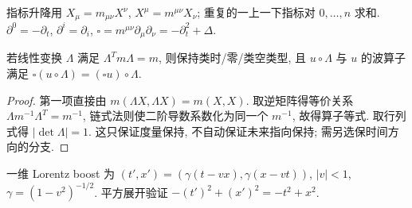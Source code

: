 指标升降用 $X_\mu=m_{\mu\nu}X^\nu$, $X^\mu=m^{\mu\nu}X_\nu$; 重复的一上一下指标对 $0,\ldots,n$ 求和. $\partial^0=-\partial_t$, $\partial^i=\partial_i$, $\square=m^{\mu\nu}\partial_\mu\partial_\nu=-\partial_t^2+\Delta$.
\begin{proposition}
若线性变换 $\Lambda$ 满足 $\Lambda^Tm\Lambda=m$, 则保持类时/零/类空类型, 且 $u\circ\Lambda$ 与 $u$ 的波算子满足 $\square(u\circ\Lambda)=(\square u)\circ\Lambda$.
\end{proposition}
\begin{proof}
第一项直接由 $m(\Lambda X,\Lambda X)=m(X,X)$. 取逆矩阵得等价关系 $\Lambda m^{-1}\Lambda^T=m^{-1}$, 链式法则使二阶导数系数化为同一个 $m^{-1}$, 故得算子等式. 取行列式得 $|\det\Lambda|=1$. 这只保证度量保持, 不自动保证未来指向保持; 需另选保时间方向的分支.
\end{proof}
一维 Lorentz boost 为 $(t',x')=(\gamma(t-vx),\gamma(x-vt))$, $|v|<1$, $\gamma=(1-v^2)^{-1/2}$. 平方展开验证 $-(t')^2+(x')^2=-t^2+x^2$.

